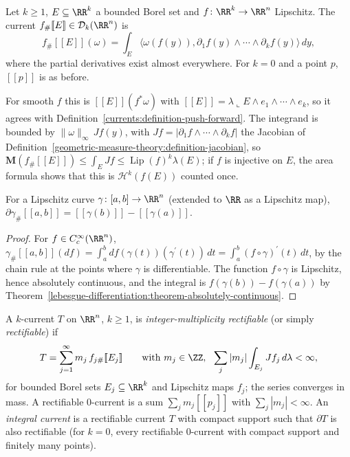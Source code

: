 \begin{definition}\label{currents:definition-lipschitz-image}
Let $k \geq 1$, $E \subseteq \RR^k$ a bounded Borel set and $f \colon \RR^k \to \RR^n$ Lipschitz. The current $f_\#[\![E]\!] \in \mathcal{D}_k(\RR^n)$ is
\[
f_\#[\![E]\!](\omega) = \int_E\bigl\langle\omega(f(y)), \partial_1f(y) \wedge \cdots \wedge \partial_kf(y)\bigr\rangle\,dy,
\]
where the partial derivatives exist almost everywhere. For $k = 0$ and a point $p$, $[\![p]\!]$ is as before.
\end{definition}

For smooth $f$ this is $[\![E]\!](f^*\omega)$ with $[\![E]\!] = \lambda\llcorner E \wedge e_1 \wedge \cdots \wedge e_k$, so it agrees with Definition~\ref{currents:definition-push-forward}. The integrand is bounded by
$\|\omega\|_\infty\,Jf(y)$, with $Jf = |\partial_1f \wedge \cdots \wedge \partial_kf|$ the Jacobian of Definition~\ref{geometric-measure-theory:definition-jacobian}, so
$\mathbf{M}(f_\#[\![E]\!]) \leq \int_EJf \leq \operatorname{Lip}(f)^k\lambda(E)$; if $f$ is injective on $E$, the area formula shows that this is $\mathcal{H}^k(f(E))$ counted once.

\begin{proposition}\label{currents:proposition-lipschitz-curve}
For a Lipschitz curve $\gamma \colon [a, b] \to \RR^n$ (extended to $\RR$ as a Lipschitz map), $\partial\gamma_\#[\![a, b]\!] = [\![\gamma(b)]\!] - [\![\gamma(a)]\!]$.
\end{proposition}

\begin{proof}
For $f \in C^\infty_c(\RR^n)$, $\gamma_\#[\![a, b]\!](df) = \int_a^bdf(\gamma(t))(\gamma^{\prime}(t))\,dt = \int_a^b(f \circ \gamma)^{\prime}(t)\,dt$, by the chain rule at the points where $\gamma$ is differentiable. The function
$f \circ \gamma$ is Lipschitz, hence absolutely continuous, and the integral is $f(\gamma(b)) - f(\gamma(a))$ by Theorem~\ref{lebesgue-differentiation:theorem-absolutely-continuous}.
\end{proof}

\begin{definition}\label{currents:definition-integral-current}
A $k$-current $T$ on $\RR^n$, $k \geq 1$, is \emph{integer-multiplicity rectifiable} (or simply \emph{rectifiable}) if
\[
T = \sum_{j=1}^\infty m_j\,f_{j\#}[\![E_j]\!] \qquad \text{with } m_j \in \ZZ,\ \ \sum_j|m_j|\int_{E_j}Jf_j\,d\lambda < \infty,
\]
for bounded Borel sets $E_j \subseteq \RR^k$ and Lipschitz maps $f_j$; the series converges in mass. A rectifiable $0$-current is a sum $\sum_jm_j[\![p_j]\!]$ with $\sum_j|m_j| < \infty$. An \emph{integral current} is a
rectifiable current $T$ with compact support such that $\partial T$ is also rectifiable (for $k = 0$, every rectifiable $0$-current with compact support and finitely many points).
\end{definition}

